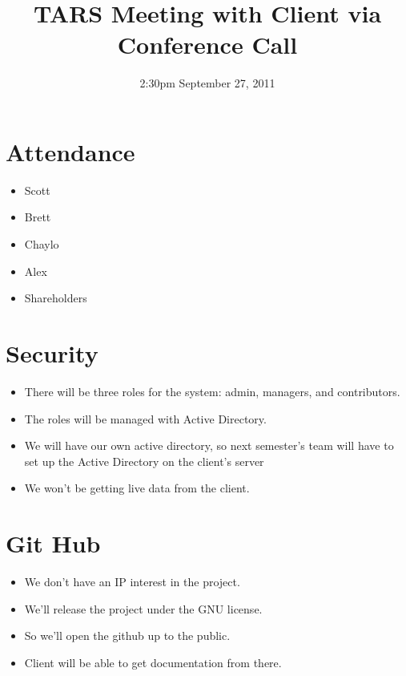 \documentclass{article}
\begin{document}
\title{TARS Meeting with Client via Conference Call}
\date{2:30pm September 27, 2011}
\maketitle

\section{Attendance}
\begin{itemize}
\item Scott
\item Brett
\item Chaylo
\item Alex
\item Shareholders
\end{itemize}

\section{Security}
\begin{itemize}
\item There will be three roles for the system: admin, managers, and contributors.
\item The roles will be managed with Active Directory.
\item We will have our own active directory, so next semester's team will have to set up the Active Directory on the client's server
\item We won't be getting live data from the client.
\end{itemize}

\section{Git Hub}
\begin{itemize}
\item We don't have an IP interest in the project.
\item We'll release the project under the GNU license.
\item So we'll open the github up to the public.
\item Client will be able to get documentation from there.
\end{itemize}
\end{document}
